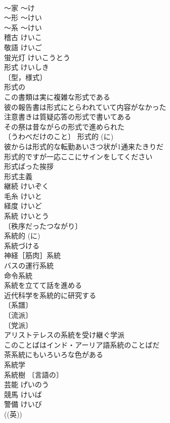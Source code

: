 \documentclass[8pt]{extreport}
\begin{document}
\begin{CJK}{UTF8}{min}
\\	～家	～け	
\\	～形	～けい	
\\	～系	～けい	
\\	稽古	けいこ	
\\	敬語	けいご	
\\	蛍光灯	けいこうとう	
\\	形式	けいしき	
\\	〔型，様式〕
\\	形式の 
\\	この書類は実に複雑な形式である 
\\	彼の報告書は形式にとらわれていて内容がなかった 
\\	注意書きは質疑応答の形式で書いてある 
\\	その祭は昔ながらの形式で進められた 
\\	〔うわべだけのこと〕 形式的 (に) 
\\	彼からは形式的な転勤あいさつ状が1通来たきりだ 
\\	形式的ですが一応ここにサインをしてください 
\\	形式ばった挨拶 
\\	形式主義 
\\	継続	けいぞく	
\\	毛糸	けいと	
\\	経度	けいど	
\\	系統	けいとう	
\\	〔秩序だったつながり〕
\\	系統的 (に) 
\\	系統づける 
\\	神経［筋肉］系統 
\\	バスの運行系統 
\\	命令系統 
\\	系統を立てて話を進める 
\\	近代科学を系統的に研究する 
\\	〔系譜〕
\\	〔流派〕
\\	〔党派〕
\\	アリストテレスの系統を受け継ぐ学派 
\\	このことばはインド・アーリア語系統のことばだ 
\\	茶系統にもいろいろな色がある 
\\	系統学 
\\	系統樹 〔言語の〕
\\	芸能	げいのう	
\\	競馬	けいば	
\\	警備	けいび	
\\	((英)) 

\end{CJK}
\end{document}
